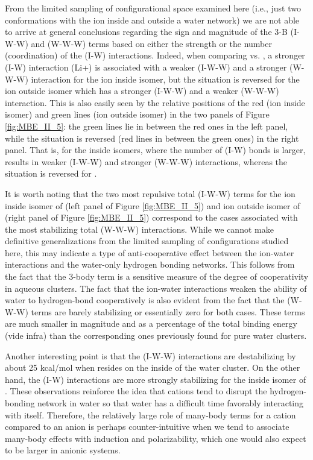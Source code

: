 \documentclass[11pt, proquest]{uwthesis}[2020/02/24]
\let\ce\ch
\begin{document}
\par From the limited sampling of configurational space examined here (i.e., just two conformations with the ion inside and outside a water network) we are not able to arrive at general conclusions regarding the sign and magnitude of the 3-B (I-W-W) and (W-W-W) terms based on either the strength or the number (coordination) of the (I-W) interactions. Indeed, when comparing \ce{Li^+} vs. \ce{Cl^-}, a stronger (I-W) interaction (Li+) is associated with a weaker (I-W-W) and a stronger (W-W-W) interaction for the ion inside isomer, but the situation is reversed for the ion outside isomer which has a stronger (I-W-W) and a weaker (W-W-W) interaction. This is also easily seen by the relative positions of the red (ion inside isomer) and green lines (ion outside isomer) in the two panels of Figure \ref{fig:MBE_II_5}: the green lines lie in between the red ones in the left panel, while the situation is reversed (red lines in between the green ones) in the right panel. That is, for the inside isomers, where the number of (I-W) bonds is larger, \ce{Li^+} results in weaker (I-W-W) and stronger (W-W-W) interactions, whereas the situation is reversed for \ce{Cl^-}.

\par It is worth noting that the two most repulsive total (I-W-W) terms for the ion inside isomer of \ce{Li^+(H2O)9} (left panel of Figure \ref{fig:MBE_II_5}) and ion outside isomer of \ce{Cl^-(H2O)9} (right panel of Figure \ref{fig:MBE_II_5}) correspond to the cases associated with the most stabilizing total (W-W-W) interactions. While we cannot make definitive generalizations from the limited sampling of configurations studied here, this may indicate a type of anti-cooperative effect between the ion-water interactions and the water-only hydrogen bonding networks. This follows from the fact that the 3-body term is a sensitive measure of the degree of cooperativity in aqueous clusters.\autocite{xantheas_cooperativity_2000} The fact that the ion-water interactions weaken the ability of water to hydrogen-bond cooperatively\autocite{xantheas_cooperativity_2000} is also evident from the fact that the (W-W-W) terms are barely stabilizing or essentially zero for both cases. These terms are much smaller in magnitude and as a percentage of the total binding energy (vide infra) than the corresponding ones previously found for pure water clusters.\autocite{heindel_many-body_2020}

\par Another interesting point is that the (I-W-W) interactions are destabilizing by about 25 kcal/mol when \ce{Li^+} resides on the inside of the water cluster. On the other hand, the (I-W) interactions are more strongly stabilizing for the inside isomer of \ce{Li^+(H2O)9}. These observations reinforce the idea that cations tend to disrupt the hydrogen-bonding network in water so that water has a difficult time favorably interacting with itself. Therefore, the relatively large role of many-body terms for a cation compared to an anion is perhaps counter-intuitive when we tend to associate many-body effects with induction and polarizability,\autocite{heindel_origin_2018,zhuang_many-body_2019} which one would also expect to be larger in anionic systems.
\end{document}
